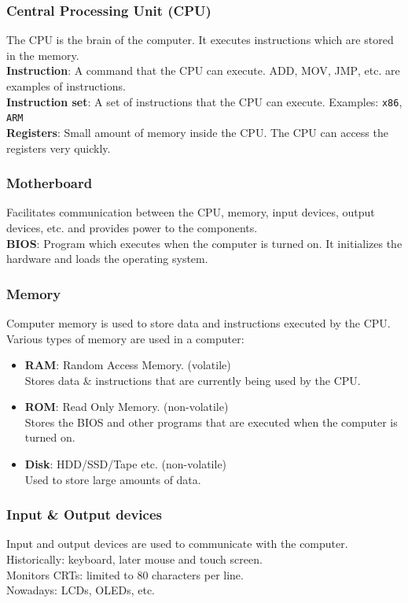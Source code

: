 \documentclass{beamer}
\begin{document}
\begin{frame}
  \frametitle{Central Processing Unit (CPU)}
  The CPU is the brain of the computer. It executes instructions which are stored in the memory.\\
  \vspace{5mm}
  \textbf{Instruction}: A command that the CPU can execute. \textsc{ADD}, \textsc{MOV}, \textsc{JMP}, etc. are examples of instructions.\\
  \textbf{Instruction set}: A set of instructions that the CPU can execute. Examples: \texttt{x86}, \texttt{ARM}\\
  \textbf{Registers}: Small amount of memory inside the CPU. The CPU can access the registers very quickly.\\
\end{frame}
\begin{frame}
  \frametitle{Motherboard}
  Facilitates communication between the CPU, memory, input devices, output devices, etc. and provides power to the components. \\
  \vspace{5mm}
  \textbf{BIOS}: Program which executes when the computer is turned on. It initializes the hardware and loads the operating system.\\
\end{frame}
\begin{frame}
  \frametitle{Memory}
  Computer memory is used to store data and instructions executed by the CPU.\\
  \vspace{5mm}
  Various types of memory are used in a computer: 
  \begin{itemize}
    \item \textbf{RAM}: Random Access Memory. (volatile)\\Stores data \& instructions that are currently being used by the CPU.
    \item \textbf{ROM}: Read Only Memory. (non-volatile)\\Stores the BIOS and other programs that are executed when the computer is turned on.
    \item \textbf{Disk}: HDD/SSD/Tape etc. (non-volatile)\\Used to store large amounts of data. 
  \end{itemize}
\end{frame}
\begin{frame}
  \frametitle{Input \& Output devices}
  Input and output devices are used to communicate with the computer.\\
  \vspace{5mm}
  Historically: keyboard, later mouse and touch screen. \\
  \vspace{5mm}
  Monitors CRTs: limited to 80 characters per line.\\
  \vspace{5mm}
  Nowadays: LCDs, OLEDs, etc.\\
\end{frame}
\end{document}
